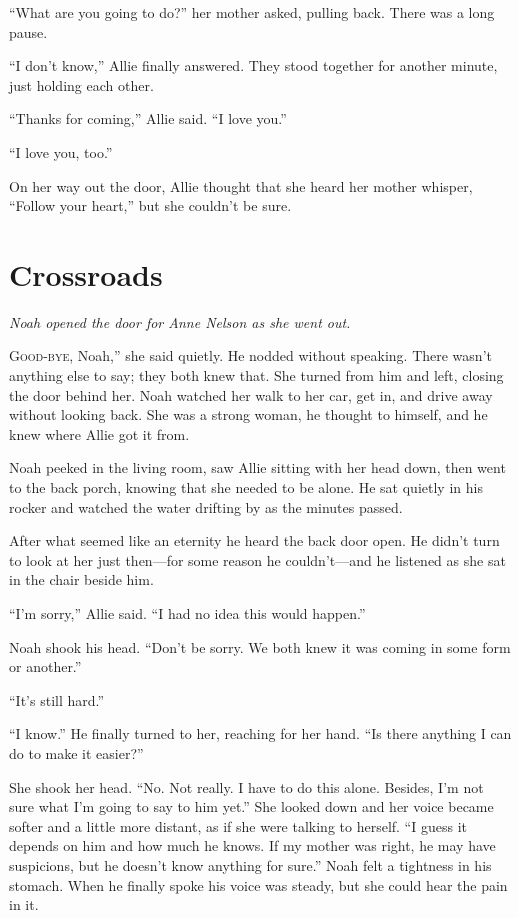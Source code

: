 \documentclass[10pt, twoside, openright]{book}
\newcommand{\chapterornament}[1]{\def\currentornament{#1}}
\def\currentornament{}
\begin{document}
``What are you going to do?'' her mother asked, pulling back. There was
a long pause.

``I don't know,'' Allie finally answered. They stood together for
another minute, just holding each other.


``Thanks for coming,'' Allie said. ``I love you.''

``I love you, too.''


On her way out the door, Allie thought that she heard her mother
whisper, ``Follow your heart,'' but she couldn't be sure.


	\newpage
\thispagestyle{empty}
\clearpage
\null
\chapterornament{89}
\chapter{Crossroads}

\textit{Noah opened the door for Anne Nelson as she went out.\\}

\lettrine[findent=0.7em, nindent=0.0em, ante=\raisebox{-0.7ex}{``}]{G}{ood-bye}, Noah,'' she said quietly. He nodded without speaking. There
wasn't anything else to say; they both knew that. She turned from him
and left, closing the door behind her. Noah watched her walk to her car,
get in, and drive away without looking back. She was a strong woman, he
thought to himself, and he knew where Allie got it from.

Noah peeked in the living room, saw Allie sitting with her head down,
then went to the back porch, knowing that she needed to be alone. He sat
quietly in his rocker and watched the water drifting by as the minutes
passed.

After what seemed like an eternity he heard the back door open. He
didn't turn to look at her just then---for some reason he couldn't---and
he listened as she sat in the chair beside him.


``I'm sorry,'' Allie said. ``I had no idea this would happen.''


Noah shook his head. ``Don't be sorry. We both knew it was coming in
some form or another.''


``It's still hard.''


``I know.'' He finally turned to her, reaching for her hand. ``Is there
anything I can do to make it easier?''

She shook her head. ``No. Not really. I have to do this alone. Besides,
I'm not sure what I'm going to say to him yet.'' She looked down and her
voice became softer and a little more distant, as if she were talking to
herself. ``I guess it depends on him and how much he knows. If my mother
was right, he may have suspicions, but he doesn't know anything for
sure.'' Noah felt a tightness in his stomach. When he finally spoke his
voice was steady, but she could hear the pain in it.
\end{document}
